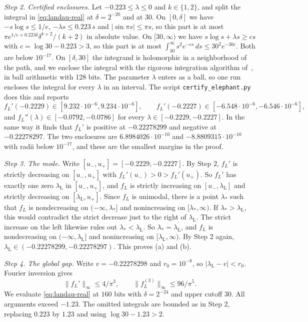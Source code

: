 \emph{Step 2. Certified enclosures.} Let $-0.223\le\lambda\le0$ and
$k\in\{1,2\}$, and split the integral in \eqref{eq:landau-real} at
$\delta=2^{-20}$ and at $30$. On $[0,\delta]$ we have $-s\log s\le1/e$,
$-\lambda s\le0.223\,s$ and $\lvert\sin\pi s\rvert\le\pi s$, so this part is
at most $\pi e^{1/e+0.223\delta}\delta^{k+2}/(k+2)$ in absolute value. On
$[30,\infty)$ we have $s\log s+\lambda s\ge cs$ with $c=\log30-0.223>3$, so
this part is at most
$\int_{30}^\infty s^2e^{-cs}\,ds\le30^2e^{-30c}$. Both are below $10^{-17}$. On
$[\delta,30]$ the integrand is holomorphic in a neighborhood of the path, and
we enclose the integral with the rigorous integration algorithm
of~\cite{johansson2018}, in ball arithmetic with 128 bits. The
parameter $\lambda$ enters as a ball, so one run encloses the integral for
every $\lambda$ in an interval. The script \texttt{certify\_elephant.py} does
this and reports
\[
 f_L'(-0.2229)\in[9.232\cdot10^{-6},9.234\cdot10^{-6}],\qquad
 f_L'(-0.2227)\in[-6.548\cdot10^{-6},-6.546\cdot10^{-6}],
\]
and $f_L''(\lambda)\in[-0.0792,-0.0786]$ for every
$\lambda\in[-0.2229,-0.2227]$. In the same way it finds that $f_L'$ is
positive at $-0.22278299$ and negative at $-0.22278297$. The two enclosures are
$6.8984026\cdot10^{-10}$ and $-8.8809315\cdot10^{-10}$ with radii below $10^{-17}$, and
these are the smallest margins in the proof.

\emph{Step 3. The mode.} Write $[u_-,u_+]=[-0.2229,-0.2227]$. By Step 2, $f_L'$
is strictly decreasing on $[u_-,u_+]$ with $f_L'(u_-)>0>f_L'(u_+)$. So $f_L'$ has
exactly one zero $\lambda_{\mathrm L}$ in $[u_-,u_+]$, and $f_L$ is strictly increasing on
$[u_-,\lambda_{\mathrm L}]$ and strictly decreasing on $[\lambda_{\mathrm L},u_+]$. Since $f_L$ is
unimodal, there is a point $\lambda_*$ such that $f_L$ is nondecreasing on
$(-\infty,\lambda_*]$ and nonincreasing on $[\lambda_*,\infty)$. If $\lambda_*>\lambda_{\mathrm L}$, this would contradict the strict decrease just to the right of $\lambda_{\mathrm L}$. The strict increase on the left likewise rules out $\lambda_*<\lambda_{\mathrm L}$. So $\lambda_*=\lambda_{\mathrm L}$, and $f_L$ is nondecreasing on
$(-\infty,\lambda_{\mathrm L}]$ and nonincreasing on $[\lambda_{\mathrm L},\infty)$. By Step 2 again,
$\lambda_{\mathrm L}\in(-0.22278299,-0.22278297)$. This proves (a) and (b).

\emph{Step 4. The global gap.} Write $v=-0.22278298$ and
$r_0=10^{-8}$, so $|\lambda_{\mathrm L}-v|<r_0$.
Fourier inversion gives
\[
 \|f_L'\|_\infty\le4/\pi^3,\qquad
 \|f_L^{(3)}\|_\infty\le96/\pi^5.
\]
We evaluate \eqref{eq:landau-real} at $160$ bits with
$\delta=2^{-24}$ and upper cutoff $30$. All arguments exceed $-1.23$.
The omitted integrals are bounded as in Step 2, replacing $0.223$
by $1.23$ and using $\log30-1.23>2$.

